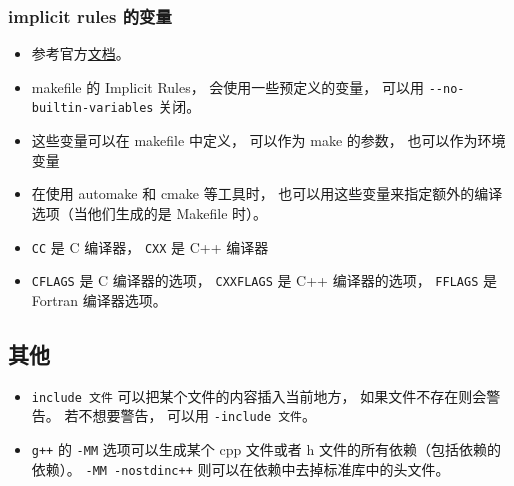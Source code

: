\subsubsection{implicit rules 的变量}
\begin{itemize}
\item 参考官方\href{https://www.gnu.org/software/make/manual/html_node/Implicit-Variables.html}{文档}。
\item makefile 的 Implicit Rules， 会使用一些预定义的变量， 可以用 \verb|--no-builtin-variables| 关闭。
\item 这些变量可以在 makefile 中定义， 可以作为 make 的参数， 也可以作为环境变量
\item 在使用 automake 和 cmake 等工具时， 也可以用这些变量来指定额外的编译选项（当他们生成的是 Makefile 时）。
\item \verb|CC| 是 C 编译器， \verb|CXX| 是 C++ 编译器
\item \verb|CFLAGS| 是 C 编译器的选项， \verb|CXXFLAGS| 是 C++ 编译器的选项， \verb|FFLAGS| 是 Fortran 编译器选项。
\end{itemize}

\subsection{其他}
\begin{itemize}
\item \verb|include 文件| 可以把某个文件的内容插入当前地方， 如果文件不存在则会警告。 若不想要警告， 可以用 \verb|-include 文件|。
\item \verb|g++| 的 \verb|-MM| 选项可以生成某个 cpp 文件或者 h 文件的所有依赖（包括依赖的依赖）。 \verb|-MM -nostdinc++| 则可以在依赖中去掉标准库中的头文件。
\end{itemize}
